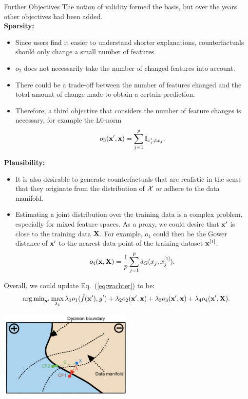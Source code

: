\documentclass[11pt,compress,t,notes=noshow, xcolor=table]{beamer}
\begin{document}
\begin{vbframe}{Further Objectives}
	The notion of validity formed the basis, but over the years other objectives had been added. \\
	\textbf{Sparsity:}
	\begin{itemize}
		\item Since users find it easier to understand shorter explanations, counterfactuals should only change a small number of features.  
		\item $o_2$ does not necessarily take the number of changed features into account. 
		\item There could be a trade-off between the number of features changed and the total amount of change made to obtain a certain prediction. 
		\item Therefore, a third objective that considers the number of feature changes is necessary, for example the L0-norm $$o_3(\xv', \xv) = \sum_{j = 1}^p \mathbb{I}_{x'_j \neq x_j}.$$ 
	\end{itemize}
	\textbf{Plausibility:}
	\begin{itemize}
		\item It is also desirable to generate counterfactuals that are realistic in the sense that they originate from the distribution of $\Xspace$ or adhere to the data manifold. 
		\item Estimating a joint distribution over the training data is a complex problem, especially for mixed feature spaces. As a proxy, we could desire that $\xv'$ is close to the training data $\Xmat$. For example, $o_4$ could then be the Gower distance of $\xv'$ to the nearest data point of the training dataset $\xv^{[1]}$. 
		$$o_4(\xv, \Xmat) =  \frac{1}{p} \sum_{j = 1}^{p}  \delta_G(x_j, x^{[1]}_j).$$
	\end{itemize}	
	Overall, we could update Eq.~(\ref{eq:wachter}) to be: 
	\begin{equation}
		\argmin_{\xv'} \max_{\lambda_1} \lambda_1 o_1(\fh(\xv'), y') + \lambda_2 o_2(\xv', \xv) + \lambda_3 o_3(\xv', \xv) + \lambda_4 o_4(\xv', \Xmat).
	\end{equation}
	
	\begin{center}
		\includegraphics[width=0.5\textwidth]{figure/counterfactuals_obj}
	\end{center}


\end{vbframe}
\end{document}
